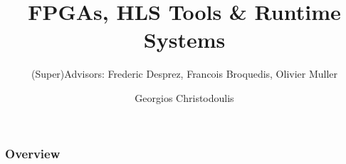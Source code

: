 \documentclass{beamer}
\title[George Christodoulis]{FPGAs, HLS Tools \& Runtime Systems} %
\subtitle{{\fontsize{8}{6}\selectfont (Super)Advisors: Frederic Desprez, Francois Broquedis, Olivier Muller}}
\author{Georgios Christodoulis} %
\institute[NTUA] %
{
CORSE$-$LIG\\ %
\medskip
\textit{gchristodoulis@gmail.com} %
}
\date{}
\begin{document}
\begin{frame}
\titlepage %
\end{frame}

\begin{frame}
\frametitle{Overview} %
\tableofcontents %
\end{frame}
\end{document}
